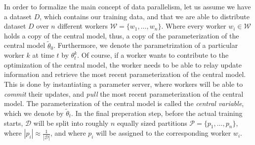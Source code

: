 In order to formalize the main concept of data parallelism, let us assume we have a dataset $D$, which contains our training data, and that we are able to distribute dataset $D$ over $n$ different workers $\mathcal{W} = \{w_1, \ldots, w_n\}$. Where every worker $w_i \in \mathcal{W}$ holds a copy of the central model, thus, a copy of the parameterization of the central model $\tilde{\theta}_0$. Furthermore, we denote the parametrization of a particular worker $k$ at time $t$ by $\theta_t^k$. Of course, if a worker wants to contribute to the optimization of the central model, the worker needs to be able to relay update information and retrieve the most recent parameterization of the central model. This is done by instantiating a parameter server, where workers will be able to \emph{commit} their updates, and \emph{pull} the most recent parameterization of the central model. The parameterization of the central model is called the \emph{central variable}, which we denote by $\tilde{\theta}_t$. In the final preperation step, before the actual training starts, $\mathcal{D}$ will be split into roughly $n$ equally sized partitions $\mathcal{P} = \{p_1, \ldots, p_n\}$, where $\left\vert{p_i}\right\vert \approx \frac{1}{\left\vert{\mathcal{D}}\right\vert}$, and where $p_i$ will be assigned to the corresponding worker $w_i$.\\

